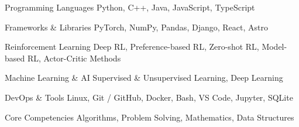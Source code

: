 

\begin{cvskills}

  \cvskill
    {Programming Languages} %
    {Python, C++, Java, JavaScript, TypeScript} %

  \cvskill
    {Frameworks \& Libraries}
    {PyTorch, NumPy, Pandas, Django, React, Astro}

  \cvskill
    {Reinforcement Learning}
    {Deep RL, Preference-based RL, Zero-shot RL, Model-based RL, Actor-Critic Methods}

  \cvskill
    {Machine Learning \& AI}
    {Supervised \& Unsupervised Learning, Deep Learning}

  \cvskill
    {DevOps \& Tools}
    {Linux, Git / GitHub, Docker, Bash, VS Code, Jupyter, SQLite}

  \cvskill
    {Core Competencies}
    {Algorithms, Problem Solving, Mathematics, Data Structures}

\end{cvskills}
